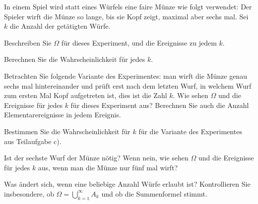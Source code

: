 In einem Spiel wird statt eines Würfels eine faire Münze wie folgt verwendet:
Der Spieler wirft die Münze so lange, bis sie Kopf zeigt, maximal aber sechs mal.
Sei $k$ die Anzahl der getätigten Würfe.
\begin{teilaufgaben}
\item
Beschreiben Sie $\Omega$ für dieses Experiment, und die Ereignisse zu jedem $k$.
\item
Berechnen Sie die Wahrscheinlichkeit für jedes $k$.
\item
Betrachten Sie folgende Variante des Experimentes: man wirft die Münze genau
sechs mal hintereinander und prüft erst nach dem letzten Wurf, in welchem Wurf
zum ersten Mal Kopf aufgetreten ist, dies ist die Zahl $k$.
Wie sehen $\Omega$ und die Ereignisse für jedes $k$ für dieses Experiment aus?
Berechnen Sie auch die Anzahl Elementarereignisse in jedem Ereignis.
\item 
Bestimmen Sie die Wahrscheinlichkeit für $k$ für die Variante des Experimentes
aus Teilaufgabe c).
\item
Ist der sechste Wurf der Münze nötig? Wenn nein, wie sehen $\Omega$ und die
Ereignisse für jedes $k$ aus, wenn man die Münze nur fünf mal wirft?
\item
Was ändert sich, wenn eine beliebige Anzahl Würfe erlaubt ist?
Kontrollieren Sie insbesondere, ob $\Omega=\bigcup_{k=1}^\infty A_k$
und ob die Summenformel stimmt.
\end{teilaufgaben}

